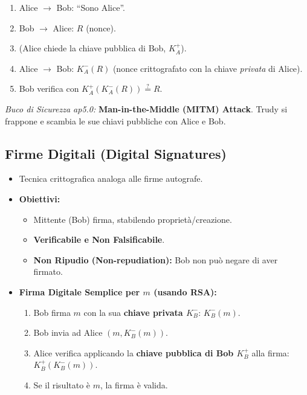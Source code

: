 \documentclass{article}
\begin{document}
\begin{itemize}
\begin{enumerate}
        \item Alice $\rightarrow$ Bob: \textquotedblleft Sono Alice\textquotedblright{}.
        \item Bob $\rightarrow$ Alice: $R$ (nonce).
        \item (Alice chiede la chiave pubblica di Bob, $K_A^+$).
        \item Alice $\rightarrow$ Bob: $K_A^-(R)$ (nonce crittografato con la chiave \textit{privata} di Alice).
        \item Bob verifica con $K_A^+(K_A^-(R)) \stackrel{?}{=} R$.
    \end{enumerate}
    \textit{Buco di Sicurezza ap5.0:} \textbf{Man-in-the-Middle (MITM) Attack}. Trudy si frappone e scambia le sue chiavi pubbliche con Alice e Bob.
\end{itemize}

\subsection{Firme Digitali (Digital Signatures)}
\begin{itemize}
    \item Tecnica crittografica analoga alle firme autografe.
    \item \textbf{Obiettivi:}
    \begin{itemize}
        \item Mittente (Bob) firma, stabilendo proprietà/creazione.
        \item \textbf{Verificabile e Non Falsificabile}.
        \item \textbf{Non Ripudio (Non-repudiation):} Bob non può negare di aver firmato.
    \end{itemize}
    \item \textbf{Firma Digitale Semplice per $m$ (usando RSA):}
    \begin{enumerate}
        \item Bob firma $m$ con la sua \textbf{chiave privata $K_B^-$}: $K_B^-(m)$.
        \item Bob invia ad Alice $(m, K_B^-(m))$.
        \item Alice verifica applicando la \textbf{chiave pubblica di Bob $K_B^+$} alla firma: $K_B^+(K_B^-(m))$.
        \item Se il risultato è $m$, la firma è valida.
    \end{enumerate}
\end{itemize}
\end{document}

